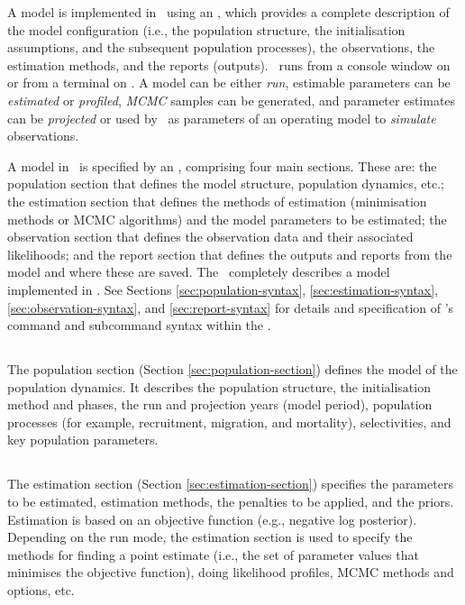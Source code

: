 A model is implemented in \CNAME\ using an \config {}, which provides a complete description of the model configuration (i.e., the population structure, the initialisation assumptions, and the subsequent population processes), the observations, the estimation methods, and the reports (outputs). \CNAME\ runs from a console window on  or from a terminal on . A model can be either \emph{run}, estimable parameters can be \emph{estimated} or \emph{profiled}, \emph{MCMC} samples can be generated, and parameter estimates can be \emph{projected} or used by \CNAME\ as parameters of an operating model to \emph{simulate} observations.

A model in \CNAME\ is specified by an \config, comprising four main sections. These are: the population section that defines the model structure, population dynamics, etc.; the estimation section that defines the methods of estimation (minimisation methods or MCMC algorithms) and the model parameters to be estimated; the observation section that defines the observation data and their associated likelihoods; and the report section that defines the outputs and reports from the model and where these are saved. The \config\ completely describes a model implemented in \CNAME. See Sections \ref{sec:population-syntax}, \ref{sec:estimation-syntax}, \ref{sec:observation-syntax}, and \ref{sec:report-syntax} for details and specification of \CNAME's command and subcommand syntax within the \config. 

\subsection{}

The population section (Section \ref{sec:population-section}) defines the model of the population dynamics. It describes the population structure, the initialisation method and phases, the run and projection years (model period), population processes (for example, recruitment, migration, and mortality), selectivities, and key population parameters.

\subsection{}

The estimation section (Section \ref{sec:estimation-section}) specifies the parameters to be estimated, estimation methods, the penalties to be applied, and the priors. Estimation is based on an objective function (e.g., negative log posterior). Depending on the run mode, the estimation section is used to specify the methods for finding a point estimate (i.e., the set of parameter values that minimises the objective function), doing likelihood profiles, MCMC methods and options, etc.

